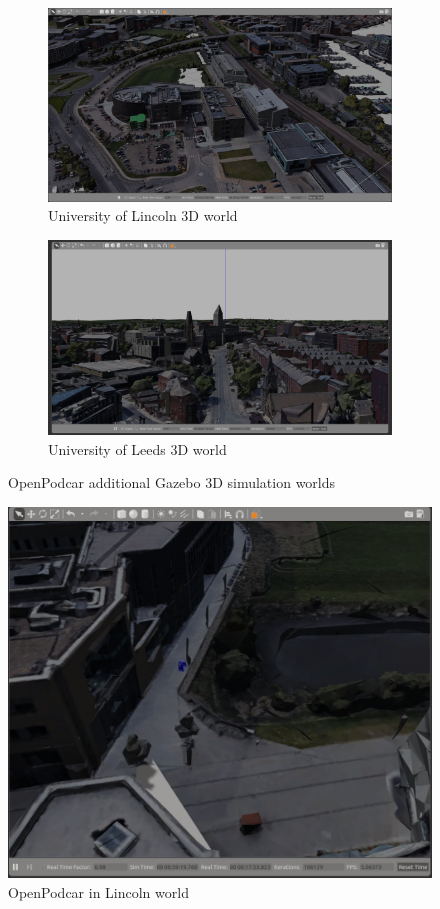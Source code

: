 \documentclass[a4paper]{article}
\begin{document}
	\begin{figure}
		\centering
		\begin{subfigure}{0.45\textwidth}
			\centering
			\includegraphics[width=\columnwidth]{figs_sim/INBLincoln_2.png}
			\caption{University of Lincoln 3D world}
			\label{fig:INB_world}
		\end{subfigure}	
		\quad
		\begin{subfigure}{0.45\textwidth}
			\centering
			\includegraphics[width=\columnwidth]{figs_sim/woodhouseLeeds_5.png}
			\caption{University of Leeds 3D world}
			\label{fig:Leeds_world}
		\end{subfigure}	
		\caption{OpenPodcar additional Gazebo 3D simulation worlds}
		\label{fig:gazebo_new_worlds}
	\end{figure}
	
	\begin{figure}
		\centering
		\includegraphics[width=0.7\columnwidth]{figs_sim/podcar_INB_sim.png}
		\caption{OpenPodcar in Lincoln world}
		\label{fig:sim_INB_world}
	\end{figure}
	
\end{document}
